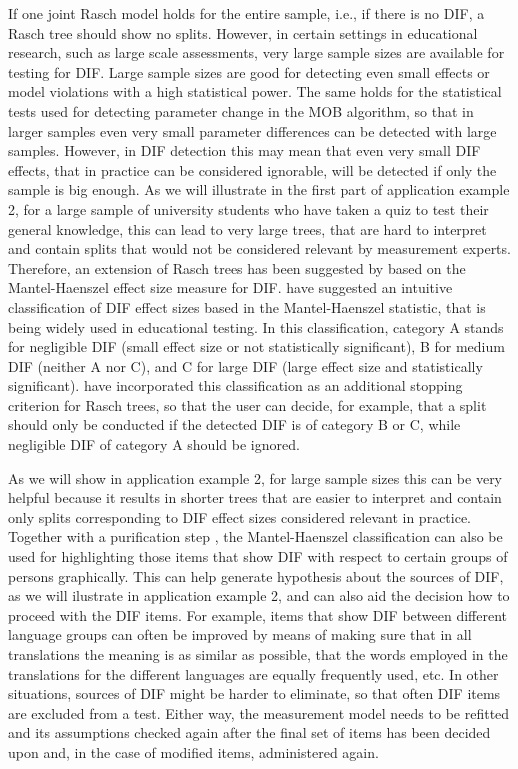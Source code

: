 \documentclass[doc,floatsintext,natbib]{apa7}
\begin{document}
If one joint Rasch model holds for the entire sample, i.e., if there is no DIF, a Rasch tree should show no splits. However, in certain settings in educational research, such as large scale assessments, very large sample sizes are available for testing for DIF. Large sample sizes are good for detecting even small effects or model violations with a high statistical power. The same holds for the statistical tests used for detecting parameter change in the MOB algorithm, so that in larger samples even very small parameter differences can be detected with large samples. However, in DIF detection this may mean that even very small DIF effects, that in practice can be considered ignorable, will be detected if only the sample is big enough. As we will illustrate in the first part of application example 2, for a large sample of university students who have taken a quiz to test their general knowledge, this can lead to very large trees, that are hard to interpret and contain splits that would not be considered relevant by measurement experts. Therefore, an extension of Rasch trees has been suggested by \citet{HenDebStr:2023:EPM} based on the Mantel-Haenszel effect size measure for DIF. \citet{HolTha:1985} have suggested an intuitive classification of DIF effect sizes based in the Mantel-Haenszel statistic, that is being widely used in educational testing. In this classification, category A stands for negligible DIF (small effect size or not statistically significant), B for medium DIF (neither A nor C), and C for large DIF (large effect size and statistically significant). \citet{HenDebStr:2023:EPM} have incorporated this classification as an additional stopping criterion for Rasch trees, so that the user can decide, for example, that a split should only be conducted if the detected DIF is of category B or C, while negligible DIF of category A should be ignored. 

As we will show in application example 2, for large sample sizes this can be very helpful because it results in shorter trees that are easier to interpret and contain only splits corresponding to DIF effect sizes considered relevant in practice. Together with a purification step \citep[see][and application example 2 for details]{HenDebStr:2023:EPM}, the Mantel-Haenszel classification can also be used for highlighting those items that show DIF with respect to certain groups of persons graphically. This can help generate hypothesis about the sources of DIF, as we will ilustrate in application example 2, and can also aid the decision how to proceed with the DIF items. 
For example, items that show DIF between different language groups can often be improved by means of making sure that in all translations the meaning is as similar as possible, that the words employed in the translations for the different languages are equally frequently used, etc. In other situations, sources of DIF might be harder to eliminate, so that often DIF items are excluded from a test. Either way, the measurement model needs to be refitted and its assumptions checked again after the final set of items has been decided upon and, in the case of modified items, administered again. 
\end{document}
